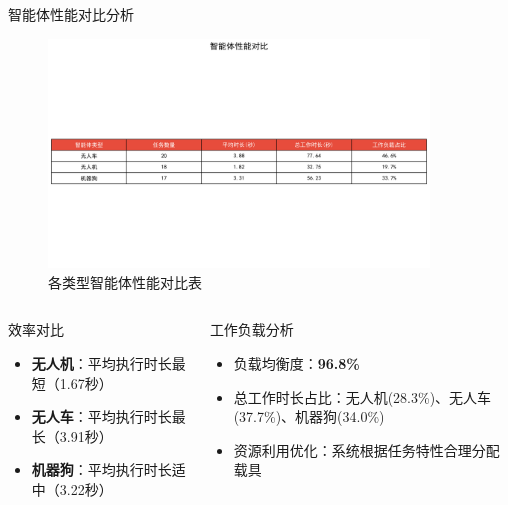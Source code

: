 \documentclass[
10pt,
aspectratio=169,
]{beamer}
\begin{document}
\begin{frame}{智能体性能对比分析}
    \begin{figure}
        \centering
        \includegraphics[width=0.9\textwidth]{analysis_results/agent_performance_table_20250617_081500.png}
        \caption{各类型智能体性能对比表}
    \end{figure}
    
    \begin{columns}
        \begin{column}{0.5\textwidth}
            \begin{exampleblock}{效率对比}
                \begin{itemize}
                    \item \textbf{无人机}：平均执行时长最短（1.67秒）
                    \item \textbf{无人车}：平均执行时长最长（3.91秒）
                    \item \textbf{机器狗}：平均执行时长适中（3.22秒）
                \end{itemize}
            \end{exampleblock}
        \end{column}
        \begin{column}{0.5\textwidth}
            \begin{alertblock}{工作负载分析}
                \begin{itemize}
                    \item 负载均衡度：\textbf{96.8\%}
                    \item 总工作时长占比：无人机(28.3\%)、无人车(37.7\%)、机器狗(34.0\%)
                    \item 资源利用优化：系统根据任务特性合理分配载具
                \end{itemize}
            \end{alertblock}
        \end{column}
    \end{columns}
\end{frame}
\end{document}
